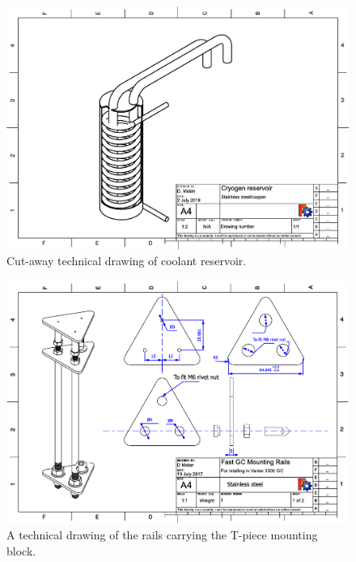 \begin{figure}
	\centering
	\includegraphics[angle=90, origin=c, scale=0.75]{./Figures/CryogenReservoir.pdf}
	\decoRule
	\caption[Coolant reservoir]{Cut-away technical drawing of coolant reservoir.}	
	\label{fig:CryogenReservoir}
\end{figure}

\begin{figure}
	\centering
	\includegraphics[angle=90, origin=c, scale=0.75]{Figures/RailsDrawing.pdf}
	\decoRule	
	
	\caption[Technical drawing of coaxial heater mounting
	rails]{\label{fig:RailsDrawing}A technical drawing of the rails carrying the
	T-piece mounting block.}
	
\end{figure}


